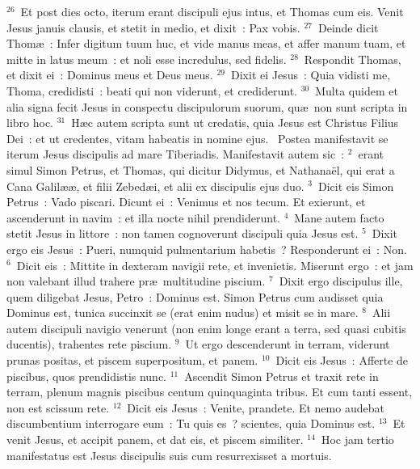 ${}^{26}$~Et post dies octo, iterum erant discipuli ejus intus, et Thomas cum eis. Venit Jesus januis clausis, et stetit in medio, et dixit~: Pax vobis.
${}^{27}$~Deinde dicit Thom\ae~: Infer digitum tuum huc, et vide manus meas, et affer manum tuam, et mitte in latus meum~: et noli esse incredulus, sed fidelis.
${}^{28}$~Respondit Thomas, et dixit ei~: Dominus meus et Deus meus.
${}^{29}$~Dixit ei Jesus~: Quia vidisti me, Thoma, credidisti~: beati qui non viderunt, et crediderunt.
${}^{30}$~Multa quidem et alia signa fecit Jesus in conspectu discipulorum suorum, qu\ae\ non sunt scripta in libro hoc.
${}^{31}$~H\ae c autem scripta sunt ut credatis, quia Jesus est Christus Filius Dei~: et ut credentes, vitam habeatis in nomine ejus.
~\lettrine[lines=10,image=true,loversize=0.05,lraise=-0.03]{P}{}ostea manifestavit se iterum Jesus discipulis ad mare Tiberiadis. Manifestavit autem sic~:
${}^{2}$~erant simul Simon Petrus, et Thomas, qui dicitur Didymus, et Nathana\"el, qui erat a Cana Galil\ae \ae , et filii Zebed\ae i, et alii ex discipulis ejus duo.
${}^{3}$~Dicit eis Simon Petrus~: Vado piscari. Dicunt ei~: Venimus et nos tecum. Et exierunt, et ascenderunt in navim~: et illa nocte nihil prendiderunt.
${}^{4}$~Mane autem facto stetit Jesus in littore~: non tamen cognoverunt discipuli quia Jesus est.
${}^{5}$~Dixit ergo eis Jesus~: Pueri, numquid pulmentarium habetis~? Responderunt ei~: Non.
${}^{6}$~Dicit eis~: Mittite in dexteram navigii rete, et invenietis. Miserunt ergo~: et jam non valebant illud trahere pr\ae\ multitudine piscium.
${}^{7}$~Dixit ergo discipulus ille, quem diligebat Jesus, Petro~: Dominus est. Simon Petrus cum audisset quia Dominus est, tunica succinxit se (erat enim nudus) et misit se in mare.
${}^{8}$~Alii autem discipuli navigio venerunt (non enim longe erant a terra, sed quasi cubitis ducentis), trahentes rete piscium.
${}^{9}$~Ut ergo descenderunt in terram, viderunt prunas positas, et piscem superpositum, et panem.
${}^{10}$~Dicit eis Jesus~: Afferte de piscibus, quos prendidistis nunc.
${}^{11}$~Ascendit Simon Petrus et traxit rete in terram, plenum magnis piscibus centum quinquaginta tribus. Et cum tanti essent, non est scissum rete.
${}^{12}$~Dicit eis Jesus~: Venite, prandete. Et nemo audebat discumbentium interrogare eum~: Tu quis es~? scientes, quia Dominus est.
${}^{13}$~Et venit Jesus, et accipit panem, et dat eis, et piscem similiter.
${}^{14}$~Hoc jam tertio manifestatus est Jesus discipulis suis cum resurrexisset a mortuis.


